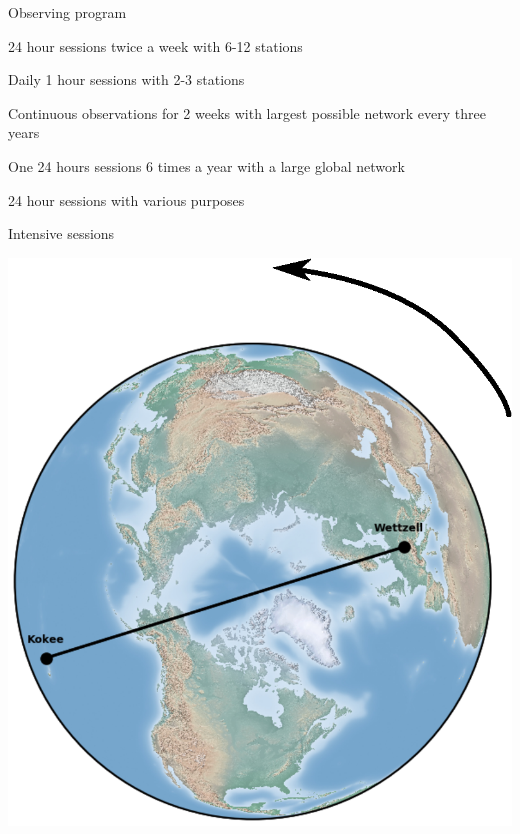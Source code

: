 \documentclass[14pt,table,t, c]{beamer}
\begin{document}
\begin{frame}{Observing program}
\begin{description}[CONT ]
  \item [\textbf{R}] 24 hour sessions twice a week with 6-12 stations
  \item [\textbf{INT}] Daily 1 hour sessions with 2-3 stations
  \item [\textbf{CONT}] Continuous observations for 2 weeks with largest possible network every three years
  \item [\textbf{T}] One 24 hours sessions 6 times a year with a large global network
  \item [\textbf{Other}] 24 hour sessions with various purposes
\end{description}
\end{frame}

\begin{frame}{Intensive sessions}
\begin{center}
	\includegraphics[height=0.8\textheight]{figure/int}
\end{center}
\end{frame}
\end{document}

